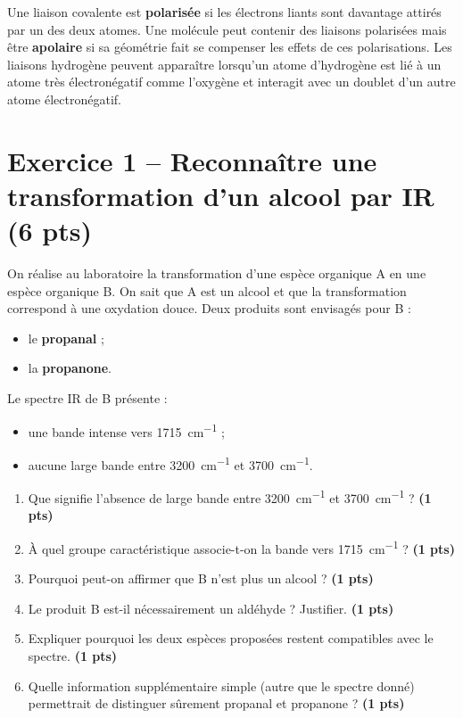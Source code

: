\documentclass[11pt,a4paper]{article}
\newcommand{\pts}[1]{\hfill{\small\textbf{(#1 pts)}}}
\begin{document}
\begin{tcolorbox}[colback=gray!7,colframe=black,title=Rappels de cours utiles]
Une liaison covalente est \textbf{polarisée} si les électrons liants sont davantage attirés par un des deux atomes. Une molécule peut contenir des liaisons polarisées mais être \textbf{apolaire} si sa géométrie fait se compenser les effets de ces polarisations. Les liaisons hydrogène peuvent apparaître lorsqu'un atome d'hydrogène est lié à un atome très électronégatif comme l'oxygène et interagit avec un doublet d'un autre atome électronégatif.
\end{tcolorbox}

\newpage
\section*{Exercice 1 -- Reconnaître une transformation d'un alcool par IR \pts{6}}

On réalise au laboratoire la transformation d'une espèce organique A en une espèce organique B. On sait que A est un alcool et que la transformation correspond à une oxydation douce. Deux produits sont envisagés pour B :

\begin{itemize}[leftmargin=1.2em]
    \item le \textbf{propanal} ;
    \item la \textbf{propanone}.
\end{itemize}

Le spectre IR de B présente :
\begin{itemize}[leftmargin=1.2em]
    \item une bande intense vers \SI{1715}{cm^{-1}} ;
    \item aucune large bande entre \SI{3200}{cm^{-1}} et \SI{3700}{cm^{-1}}.
\end{itemize}

\begin{enumerate}[label=\textbf{\arabic*.},leftmargin=1.2em]
    \item Que signifie l'absence de large bande entre \SI{3200}{cm^{-1}} et \SI{3700}{cm^{-1}} ? \pts{1}
    \item À quel groupe caractéristique associe-t-on la bande vers \SI{1715}{cm^{-1}} ? \pts{1}
    \item Pourquoi peut-on affirmer que B n'est plus un alcool ? \pts{1}
    \item Le produit B est-il nécessairement un aldéhyde ? Justifier. \pts{1}
    \item Expliquer pourquoi les deux espèces proposées restent compatibles avec le spectre. \pts{1}
    \item Quelle information supplémentaire simple (autre que le spectre donné) permettrait de distinguer sûrement propanal et propanone ? \pts{1}
\end{enumerate}
\end{document}
